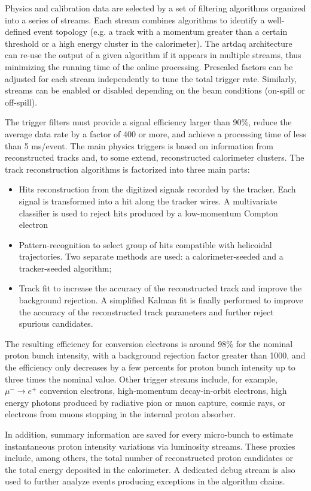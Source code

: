 Physics and calibration data are selected by a set of filtering algorithms organized into a series of streams. Each stream combines algorithms to identify a well-defined event topology (e.g. a track with a momentum greater than a certain threshold or a high energy cluster in the calorimeter). The artdaq architecture can re-use the output of a given algorithm if it appears in multiple streams, thus minimizing the running time of the online processing. Prescaled factors can be adjusted for each stream independently to tune the total trigger rate. Similarly, streams can be enabled or disabled depending on the beam conditions (on-spill or off-spill).   

The trigger filters must provide a signal efficiency larger than 90\%, reduce the average data rate by a factor of 400 or more, and achieve a processing time of less than 5 ms/event. The main physics triggers is based on information from reconstructed tracks and, to some extend, reconstructed calorimeter clusters. The track reconstruction algorithms is factorized into three main parts:
\begin{itemize}
\item Hits reconstruction from the digitized signals recorded by the tracker. Each signal is transformed into a hit along the tracker wires. A multivariate classifier is used to reject hits produced by a low-momentum Compton electron 
\item Pattern-recognition to select group of hits compatible with helicoidal trajectories. Two separate methods are used: a calorimeter-seeded and a tracker-seeded algorithm;
\item Track fit to increase the accuracy of the reconstructed track and improve the background rejection. A simplified Kalman fit is finally performed to improve the accuracy of the 
reconstructed track parameters and further reject spurious candidates.
\end{itemize}

The resulting efficiency for conversion electrons is around 98\% for the nominal proton bunch intensity, with a background rejection factor greater than 1000, and the efficiency only decreases by a few percents for proton bunch intensity up to three times the nominal value. Other trigger streams include, for example, $\mu^- \rightarrow e^+$ conversion electrons, high-momentum decay-in-orbit electrons, high energy photons produced by radiative pion or muon capture, cosmic rays, or electrons from muons stopping in the internal proton absorber.

In addition, summary information are saved for every micro-bunch to estimate instantaneous proton intensity variations via luminosity streams. These proxies include, among others, the total number of reconstructed proton candidates or the total energy deposited in the calorimeter. A dedicated debug stream is also used to further analyze events producing exceptions in the algorithm chains.  